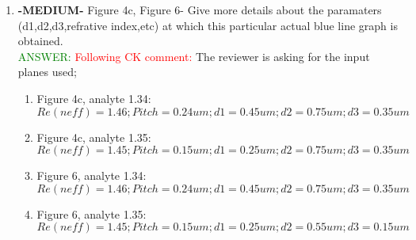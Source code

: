 \documentclass{article}
\begin{document}
\begin{enumerate}
\item \textbf{-MEDIUM-} Figure 4c, Figure 6- Give more details about the paramaters (d1,d2,d3,refrative index,etc) at which this particular actual blue line graph is obtained.\\
\textcolor{green}{ANSWER: } \textcolor{red}{Following CK comment: } The reviewer is asking for the input planes used; \\
\begin{enumerate}
\item Figure 4c, analyte 1.34: \\
$Re(neff) = 1.46; Pitch = 0.24 um ; d1 = 0.45 um; d2= 0.75um; d3 = 0.35um $ \\
\item Figure 4c, analyte 1.35: \\
$Re(neff) = 1.45; Pitch = 0.15 um ; d1 = 0.25 um; d2= 0.75um; d3 = 0.35um $ \\
\item Figure 6, analyte 1.34: \\
$Re(neff) = 1.46; Pitch = 0.24 um ; d1 = 0.45 um; d2= 0.75um; d3 = 0.35um $ \\
\item Figure 6, analyte 1.35: \\
$Re(neff) = 1.45; Pitch = 0.15 um ; d1 = 0.25 um; d2= 0.55um; d3 = 0.15um $ \\

\end{enumerate} 


\end{enumerate}
\end{document}
